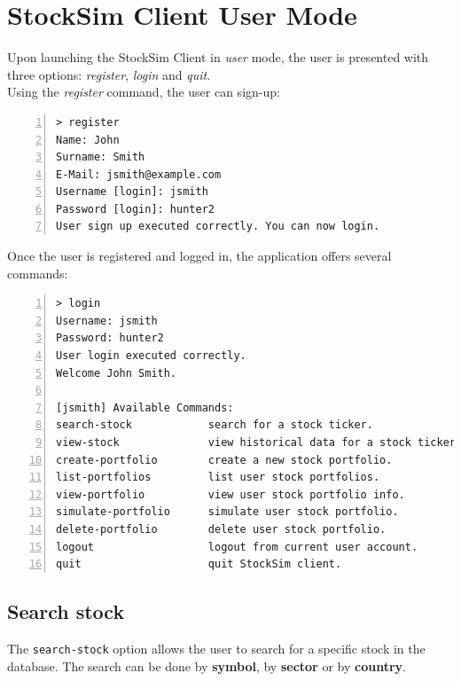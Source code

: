 \section{StockSim Client User Mode}
Upon launching the StockSim Client in \textit{user} mode, the user is presented
with three options: \textit{register}, \textit{login} and \textit{quit}.\\
Using the \textit{register} command, the user can sign-up:
\begin{lstlisting}[basicstyle=\footnotesize\ttfamily,language={},numbers=left,keepspaces=true,tabsize=4,
numberstyle=\footnotesize,numbersep=8pt,frame=single]
> register
Name: John
Surname: Smith
E-Mail: jsmith@example.com
Username [login]: jsmith
Password [login]: hunter2
User sign up executed correctly. You can now login.
\end{lstlisting}
\vspace{-0.5cm}
Once the user is registered and logged in, the application offers several commands:
\vspace{0.2cm}
\begin{lstlisting}[basicstyle=\footnotesize\ttfamily,language={},numbers=left,keepspaces=true,tabsize=4,
numberstyle=\footnotesize,numbersep=8pt,frame=single]
> login
Username: jsmith
Password: hunter2
User login executed correctly.
Welcome John Smith.

[jsmith] Available Commands:
search-stock			search for a stock ticker.              
view-stock				view historical data for a stock ticker.
create-portfolio		create a new stock portfolio.           
list-portfolios			list user stock portfolios.             
view-portfolio			view user stock portfolio info.         
simulate-portfolio		simulate user stock portfolio.          
delete-portfolio		delete user stock portfolio.            
logout					logout from current user account.       
quit					quit StockSim client.   
\end{lstlisting}

\subsection{Search stock}
The \texttt{search-stock} option allows the user to search for a specific stock in the database. The search can be done by \textbf{symbol}, by \textbf{sector} or by \textbf{country}.\\

